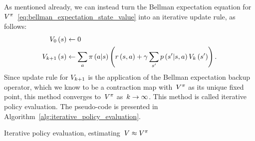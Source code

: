 As mentioned already, we can instead turn the Bellman expectation equation for~${V^{\pi}}$~\eqref{eq:bellman_expectation_state_value} into an iterative update rule, as follows:
\begin{equation}
\begin{split}
    \estimatestatevalue_{0}\left(\state\right)&\gets0 \\
    \estimatestatevalue_{\indexletter+1}\left(\state\right)&\gets\sum_{\action}\policy\left(\action\middle\vert\state\right)\left(\immediatereward\left(\state,\action\right)+\discount\sum_{\state'}\transition\left(\state'\middle\vert\state,\action\right)\estimatestatevalue_{\indexletter}\left(\state'\right)\right).
\end{split}
\end{equation}
Since update rule for ${\estimatestatevalue_{\indexletter+1}}$ is the application of the Bellman expectation backup operator, which we know to be a contraction map with~${V^{\pi}}$ as its unique fixed point, this method converges to~${V^{\pi}}$ as~${k\rightarrow\infty}$. This method is called iterative policy evaluation. The pseudo-code is presented in Algorithm~\ref{alg:iterative_policy_evaluation}.
\begin{algorithm}
	\caption{Iterative policy evaluation, estimating~${\estimatestatevalue\approx\statevalue\policyscript}$}
	\label{alg:iterative_policy_evaluation}

\end{algorithm}

